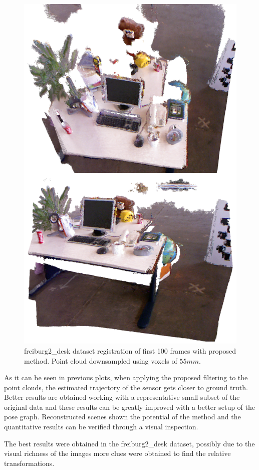 \begin{figure}[H]
\begin{center}
\includegraphics[scale=0.27]{images/freiburg2_desk.png}
\caption{freiburg2\_desk dataset registration of first 100 frames with proposed method. Point cloud downsampled using voxels of $55mm$.}
\end{center}
\end{figure}


As it can be seen in previous plots, when applying the proposed filtering to the point clouds, the estimated trajectory of the sensor gets 
closer to ground truth. Better results are obtained working with a representative small subset of the original data and these results 
can be greatly improved with a better setup of the pose graph. Reconstructed scenes shown the potential of the method and the quantitative 
results can be verified through a visual inspection. 

The best results were obtained in the freiburg2\_desk dataset, possibly due to the visual richness of the images more clues were obtained 
to find the relative transformations.
